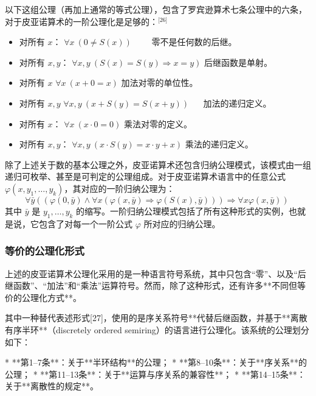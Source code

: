 以下这组公理（再加上通常的等式公理），包含了罗宾逊算术七条公理中的六条，对于皮亚诺算术的一阶公理化是足够的：\(^\text{[26]}\)
\begin{itemize}
\item 对所有 $x$：
      $\forall x\ (0 \ne S(x))$
     零不是任何数的后继。
\item 对所有 $x, y$：
      $\forall x, y\ (S(x) = S(y) \Rightarrow x = y)$
      后继函数是单射。
\item 对所有 $x$
      $\forall x\ (x + 0 = x)$
      加法对零的单位性。
\item 对所有 $x, y$
      $\forall x, y\ (x + S(y) = S(x + y))$
      加法的递归定义。
\item 对所有 $x$：
      $\forall x\ (x \cdot 0 = 0)$
      乘法对零的定义。
\item 对所有 $x, y$：
      $\forall x, y\ (x \cdot S(y) = x \cdot y + x)$
      乘法的递归定义。
\end{itemize}
除了上述关于数的基本公理之外，皮亚诺算术还包含归纳公理模式，该模式由一组递归可枚举、甚至是可判定的公理组成。对于皮亚诺算术语言中的任意公式 $\varphi(x, y_1, \ldots, y_k)$，其对应的一阶归纳公理为：
$$
\forall \bar{y} \left( \left( \varphi(0, \bar{y}) \land \forall x\left( \varphi(x, \bar{y}) \Rightarrow \varphi(S(x), \bar{y}) \right) \right) \Rightarrow \forall x \varphi(x, \bar{y}) \right)~
$$
其中 $\bar{y}$ 是 $y_1, \ldots, y_k$ 的缩写。一阶归纳公理模式包括了所有这种形式的实例，也就是说，它包含了对每一个一阶公式 $\varphi$ 所对应的归纳公理。
\subsubsection{等价的公理化形式}
上述的皮亚诺算术公理化采用的是一种语言符号系统，其中只包含“零”、以及“后继函数”、“加法”和“乘法”运算符号。然而，除了这种形式，还有许多**不同但等价的公理化方式**。

其中一种替代表述形式[27]，使用的是序关系符号**代替后继函数，并基于**离散有序半环**（discretely ordered semiring）的语言进行公理化。该系统的公理划分如下：

* **第1–7条**：关于**半环结构**的公理；
* **第8–10条**：关于**序关系**的公理；
* **第11–13条**：关于**运算与序关系的兼容性**；
* **第14–15条**：关于**离散性的规定**。
